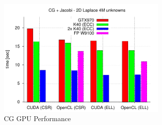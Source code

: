 \begin{figure}[h!]
\centering
\includegraphics[width=0.75\textwidth]{./fig/perf/CG_GPU.pdf}
\caption{CG GPU Performance}
\label{perf-CG-GPU}
\end{figure}

